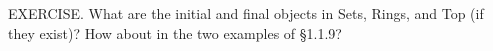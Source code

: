 EXERCISE. What are the initial and final objects in Sets, Rings, and Top (if they exist)? How about in the two examples of §1.1.9?
